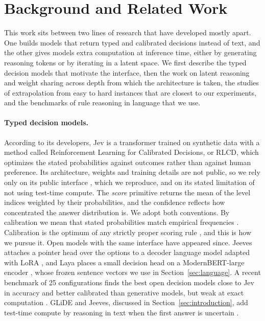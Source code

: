 \documentclass{article}
\begin{document}
\section{Background and Related Work}
\label{sec:related}

This work sits between two lines of research that have developed mostly apart. One builds models that return typed and calibrated decisions instead of text, and the other gives models extra computation at inference time, either by generating reasoning tokens or by iterating in a latent space. We first describe the typed decision models that motivate the interface, then the work on latent reasoning and weight sharing across depth from which the architecture is taken, the studies of extrapolation from easy to hard instances that are closest to our experiments, and the benchmarks of rule reasoning in language that we use.

\paragraph{Typed decision models.} According to its developers, Jev \cite{typesafe2026jev} is a transformer trained on synthetic data with a method called Reinforcement Learning for Calibrated Decisions, or RLCD, which optimizes the stated probabilities against outcomes rather than against human preference. Its architecture, weights and training details are not public, so we rely only on its public interface \cite{typesafe2026docs}, which we reproduce, and on its stated limitation of not using test-time compute. The \emph{score} primitive returns the mean of the level indices weighted by their probabilities, and the confidence reflects how concentrated the answer distribution is. We adopt both conventions. By calibration we mean that stated probabilities match empirical frequencies \cite{guo2017calibration}. Calibration is the optimum of any strictly proper scoring rule \cite{gneiting2007scoring}, and this is how we pursue it. Open models with the same interface have appeared since. Jeeves attaches a pointer head over the options to a decoder language model adapted with LoRA \cite{posthog2026jeeves}, and Laya places a small decision head on a ModernBERT-large encoder \cite{convai2026laya, warner2024modernbert}, whose frozen sentence vectors we use in Section~\ref{sec:language}. A recent benchmark of 25 configurations finds the best open decision models close to Jev in accuracy and better calibrated than generative models, but weak at exact computation \cite{duan2026jeval}. GLiDE and Jeeves, discussed in Section~\ref{sec:introduction}, add test-time compute by reasoning in text when the first answer is uncertain \cite{anthus2026glide, posthog2026jeeves}.
\end{document}
